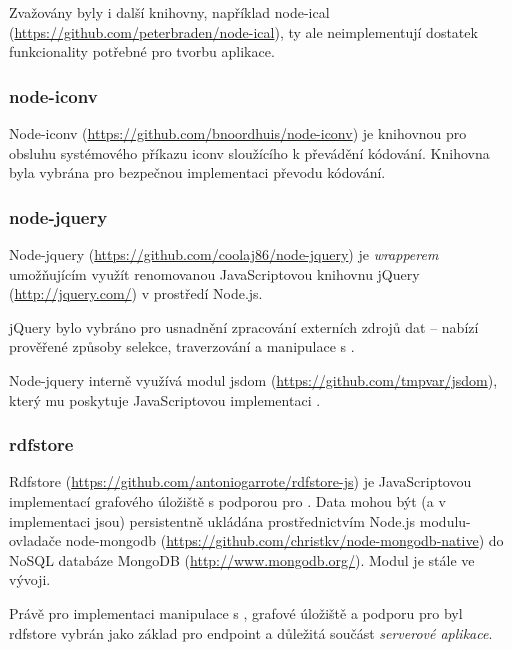 Zvažovány byly i další knihovny, například node-ical (\url{https://github.com/peterbraden/node-ical}), ty ale neimplementují dostatek funkcionality potřebné pro tvorbu aplikace.

\subsubsection{node-iconv}
Node-iconv (\url{https://github.com/bnoordhuis/node-iconv}) je knihovnou pro obsluhu systémového příkazu iconv sloužícího k převádění kódování. Knihovna byla vybrána pro bezpečnou implementaci převodu kódování.

\subsubsection{node-jquery}
Node-jquery (\url{https://github.com/coolaj86/node-jquery}) je \textit{wrapperem} umožňujícím využít renomovanou JavaScriptovou knihovnu jQuery (\url{http://jquery.com/}) v prostředí Node.js.

jQuery bylo vybráno pro usnadnění zpracování externích zdrojů dat -- nabízí prověřené způsoby selekce, traverzování a manipulace s .

Node-jquery interně využívá modul jsdom (\url{https://github.com/tmpvar/jsdom}), který mu poskytuje JavaScriptovou implementaci .

\subsubsection{rdfstore}
\label{sec:rdfstore}
Rdfstore (\url{https://github.com/antoniogarrote/rdfstore-js}) je JavaScriptovou implementací  grafového úložiště s podporou pro . Data mohou být (a v implementaci  jsou) persistentně ukládána prostřednictvím Node.js modulu-ovladače node-mongodb (\url{https://github.com/christkv/node-mongodb-native}) do NoSQL databáze MongoDB (\url{http://www.mongodb.org/}). Modul je stále ve vývoji.

Právě pro implementaci manipulace s , grafové úložiště a podporu pro  byl rdfstore vybrán jako základ pro  endpoint a důležitá součást \textit{serverové aplikace}.




